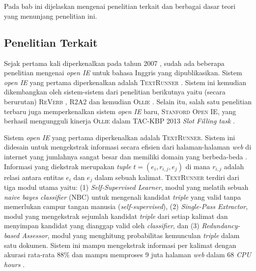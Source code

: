 \chapter{\babDua}
Pada bab ini dijelaskan mengenai penelitian terkait dan berbagai dasar teori yang menunjang penelitian ini.

\section{Penelitian Terkait}

Sejak pertama kali diperkenalkan pada tahun 2007 \citep{banko2007open}, sudah ada beberapa penelitian mengenai \textit{open IE} untuk bahasa Inggris yang dipublikasikan. Sistem \textit{open IE} yang pertama diperkenalkan adalah \textsc{TextRunner} \citep{banko2007open}. Sistem ini kemudian dikembangkan oleh sistem-sistem dari penelitian berikutnya yaitu (secara berurutan) \textsc{ReVerb} \citep{fader2011identifying}, \textsc{R2A2} \citep{etzioni2011open} dan kemudian \textsc{Ollie} \citep{schmitz2012open}	. Selain itu, salah satu penelitian terbaru juga memperkenalkan sistem \textit{open IE} baru, \textsc{Stanford Open IE}, yang berhasil mengungguli kinerja \textsc{Ollie} dalam TAC-KBP 2013 \textit{Slot Filling task} \citep{angeli2015leveraging}.

Sistem \textit{open IE} yang pertama diperkenalkan adalah \textsc{TextRunner}. Sistem ini didesain untuk mengekstrak informasi secara efisien dari halaman-halaman \textit{web} di internet yang jumlahnya sangat besar dan memiliki domain yang berbeda-beda \citep{banko2007open}. Informasi yang diekstrak merupakan \textit{tuple} $t = (e_i, r_{i,j}, e_j)$ di mana $r_{i,j}$ adalah relasi antara entitas $e_i$ dan $e_j$ dalam sebuah kalimat. \textsc{TextRunner} terdiri dari tiga modul utama \citep{banko2007open} yaitu: (1) \textit{Self-Supervised Learner}, modul yang melatih sebuah \textit{naive bayes classifier} (NBC) untuk mengenali kandidat \textit{triple} yang valid tanpa memerlukan campur tangan manusia (\textit{self-supervised}), (2) \textit{Single-Pass Extractor}, modul yang mengekstrak sejumlah kandidat \textit{triple} dari setiap kalimat dan menyimpan kandidat yang dianggap valid oleh \textit{classifier}, dan (3) \textit{Redundancy-based Assessor}, modul yang menghitung probabilitas kemunculan \textit{triple} dalam satu dokumen. Sistem ini mampu mengekstrak informasi per kalimat dengan akurasi rata-rata 88\% dan mampu memproses 9 juta halaman \textit{web} dalam 68 \textit{CPU hours} \citep{banko2007open}.

